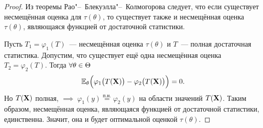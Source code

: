 \begin{proof}
    Из теоремы Рао"--~Блекуэлла"--~Колмогорова следует, что если существует несмещённая оценка для $\tau(\theta)$, 
    то существует также и несмещённая оценка $\tau(\theta)$, являющаяся функцией от достаточной статистики.

    Пусть $T_1 = \varphi_1(T)$~--- несмещённая оценка $\tau(\theta)$ и $T$~--- полная достаточная статистика.
    Допустим, что существует ещё одна несмещённая оценка $T_2 = \varphi_2(T)$.
    Тогда $\forall \theta \in \Theta$
    \begin{equation*}
        \operatorname{\operatorname{\mathbb{E}}_{\theta}} \Bigl(\varphi_1\bigl(T(\mathbf{X})\bigr) - \varphi_2\bigl(T(\mathbf{X})\bigr) \Bigr) = 0.
    \end{equation*}
    Но $T(\mathbf{X})$ полная, $\implies \; \varphi_1(y) \overset{\text{п.н.}}{=} \varphi_2(y)$ на области значений $T(\mathbf{X})$.
    Таким образом, несмещённая оценка, являющаяся функцией от достаточной статистики, единственна.
    Значит, она и будет оптимальной оценкой $\tau(\theta)$.

\end{proof}
